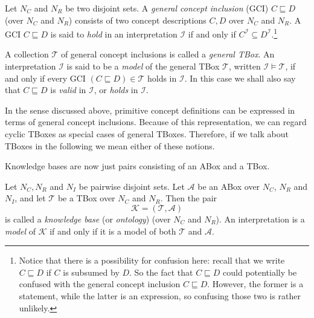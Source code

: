 \begin{Definition}
  \label{def:general-concept-inclusions-and-general-TBoxes}
  Let $N_C$ and $N_R$ be two disjoint sets.  A \emph{general concept inclusion} (GCI) $C
  \sqsubseteq D$ (over $N_C$ and $N_R$) consists of two concept descriptions $C, D$ over
  $N_C$ and $N_R$.  A GCI $C \sqsubseteq D$ is said to \emph{hold} in an interpretation
  $\mathcal{I}$ if and only if $C^{\mathcal{I}} \subseteq
  D^{\mathcal{I}}$.\footnote{Notice that there is a possibility for confusion here: recall
    that we write $C \sqsubseteq D$ if $C$ is subsumed by $D$.  So the fact that $C
    \sqsubseteq D$ could potentially be confused with the general concept inclusion $C
    \sqsubseteq D$.  However, the former is a statement, while the latter is an
    expression, so confusing those two is rather unlikely.}

  A collection $\mathcal{T}$ of general concept inclusions is called a \emph{general
    TBox}.  An interpretation $\mathcal{I}$ is said to be a \emph{model} of the general
  TBox $\mathcal{T}$, written $\mathcal{I} \models \mathcal{T}$, if and only if every GCI
  $(C \sqsubseteq D) \in \mathcal{T}$ holds in $\mathcal{I}$.  In this case we shall also
  say that $C \sqsubseteq D$ is \emph{valid} in $\mathcal{I}$, or \emph{holds} in
  $\mathcal{I}$.
\end{Definition}

In the sense discussed above, primitive concept definitions can be expressed in terms of
general concept inclusions.  Because of this representation, we can regard cyclic TBoxes
as special cases of general TBoxes.  Therefore, if we talk about TBoxes in the following
we mean either of these notions.

Knowledge bases are now just pairs consisting of an ABox and a TBox.
\begin{Definition}
  \label{def:knowledge-base}
  Let $N_C, N_R$ and $N_I$ be pairwise disjoint sets.  Let $\mathcal{A}$ be an ABox over
  $N_C$, $N_R$ and $N_I$, and let $\mathcal{T}$ be a TBox over $N_C$ and $N_R$.  Then the
  pair
  \begin{equation*}
    \mathcal{K} = (\mathcal{T}, \mathcal{A})
  \end{equation*}
  is called a \emph{knowledge base} (or \emph{ontology}) (over $N_C$ and $N_R$).  An
  interpretation is a \emph{model} of $\mathcal{K}$ if and only if it is a model of both
  $\mathcal{T}$ and $\mathcal{A}$.
\end{Definition}

